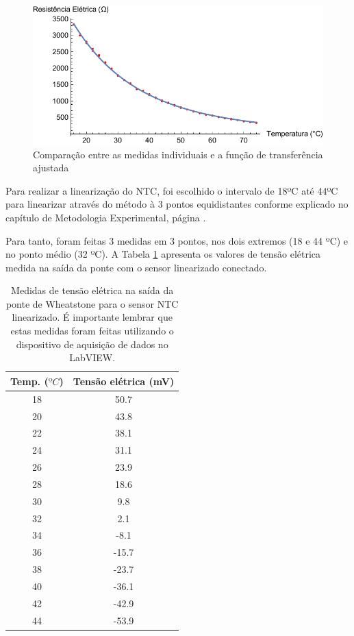 \documentclass[a4paper]{instrumentacao}
\begin{document}
\begin{figure}[H]
\center
\includegraphics[width=\textwidth]{NTC-FitPlot.pdf}
\caption{Comparação entre as medidas individuais e a função de transferência ajustada}
\label{fig:ntc-experimental-comparacao}
\end{figure}

Para realizar a linearização do NTC, foi escolhido o intervalo de 18ºC até 44ºC para linearizar através do método à 3 pontos equidistantes conforme explicado no capítulo de Metodologia Experimental, página \pageref{sec:ntc-linearizacao}.

Para tanto, foram feitas 3 medidas em 3 pontos, nos dois extremos (18 e 44 ºC) e no ponto médio (32 ºC). A Tabela \ref{tab:ntc-linearizado} apresenta os valores de tensão elétrica medida na saída da ponte com o sensor linearizado conectado.

\begin{table}[H]
\centering
\caption{Medidas de tensão elétrica na saída da ponte de Wheatstone para o sensor NTC linearizado. É importante lembrar que estas medidas foram feitas utilizando o dispositivo de aquisição de dados no LabVIEW.}
\label{tab:ntc-linearizado}
\begin{tabular}{|c|c|}
\hline
\textbf{Temp. ($ºC$)} & \textbf{Tensão elétrica (mV)} \\ \hline
 18 & 50.7  \\ \hline
 20 & 43.8  \\ \hline
 22 & 38.1  \\ \hline
 24 & 31.1  \\ \hline
 26 & 23.9  \\ \hline
 28 & 18.6  \\ \hline
 30 & 9.8   \\ \hline
 32 & 2.1   \\ \hline
 34 & -8.1  \\ \hline
 36 & -15.7 \\ \hline
 38 & -23.7 \\ \hline
 40 & -36.1 \\ \hline
 42 & -42.9 \\ \hline
 44 & -53.9 \\ \hline
\end{tabular}
\end{table}
\end{document}
